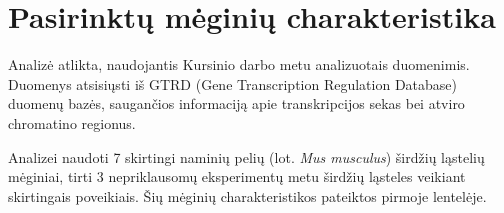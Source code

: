 \documentclass[12pt]{article}
\begin{document}
\newpage


\section{Pasirinktų mėginių charakteristika}
Analizė atlikta, naudojantis Kursinio darbo metu analizuotais duomenimis.
Duomenys atsisiųsti iš GTRD (Gene Transcription Regulation Database)\cite{GTRD}
duomenų bazės, saugančios informaciją apie transkripcijos sekas bei atviro
chromatino regionus.

Analizei naudoti 7 skirtingi naminių pelių (lot. \emph{Mus musculus}) širdžių
ląstelių mėginiai, tirti 3 nepriklausomų eksperimentų metu širdžių ląsteles
veikiant skirtingais poveikiais. Šių mėginių charakteristikos pateiktos pirmoje
lentelėje.
\end{document}
